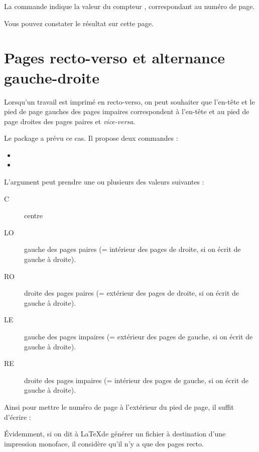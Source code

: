 La commande  indique la valeur du compteur , correspondant au numéro de page.

Vous pouvez constater le résultat sur cette page.\thispagestyle{fancy}\cfoot{{\thepage} / \ref{TotPages}} \renewcommand{\headrulewidth}{0pt}

\section{Pages recto-verso et alternance gauche-droite}

Lorsqu'un travail est imprimé en recto-verso, on peut souhaiter que l'en-tête et le pied de page gauches des pages impaires correspondent à l'en-tête et au pied de page droites des pages paires et \emph{vice-versa}.

Le package  a prévu ce cas. Il propose deux commandes : 
\begin{itemize}
\item {}
\item {}
\end{itemize}

L'argument  peut prendre une ou plusieurs des valeurs suivantes :
\begin{description}
\item[C] centre
\item[LO] gauche des pages paires (= intérieur des pages de droite, si on écrit de gauche à droite).
\item[RO] droite des pages paires (= extérieur des pages de droite, si on écrit de gauche à droite).
\item[LE] gauche des pages impaires (= extérieur des pages  de gauche, si on écrit de gauche à droite).
\item[RE] droite des pages impaires (= intérieur des pages de gauche, si on écrit de gauche à droite).
\end{description}

Ainsi pour mettre le numéro de page à l'extérieur du pied de page, il suffit d'écrire :

\begin{latexcode}
\fancyfoot[LE,RO]{\thepage}
\end{latexcode}

Évidemment, si on dit à \LaTeX de générer un fichier à destination d'une impression monoface, il considère qu'il n'y a que des pages recto.

